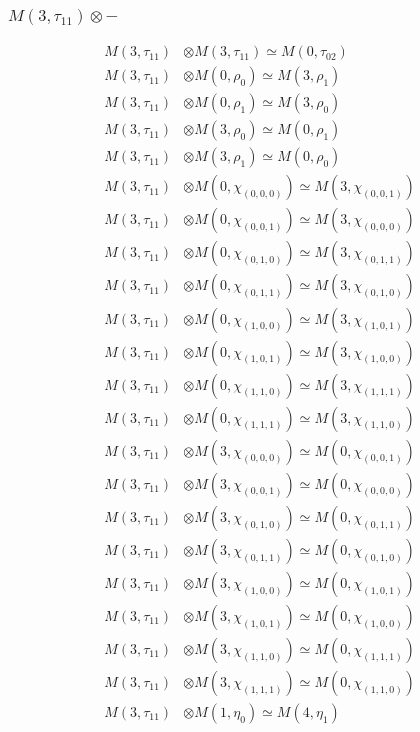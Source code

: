 \subsubsection{$ M(3,\tau_{11})\otimes -$}
\begin{align*}
M(3,\tau_{11}) &\otimes M(3,\tau_{11}) \simeq M(0,\tau_{02}) \\
M(3,\tau_{11}) &\otimes M(0,\rho_{0}) \simeq M(3,\rho_{1}) \\
M(3,\tau_{11}) &\otimes M(0,\rho_{1}) \simeq M(3,\rho_{0}) \\
M(3,\tau_{11}) &\otimes M(3,\rho_{0}) \simeq M(0,\rho_{1}) \\
M(3,\tau_{11}) &\otimes M(3,\rho_{1}) \simeq M(0,\rho_{0}) \\
M(3,\tau_{11}) &\otimes M(0,\chi_{(0,0,0)}) \simeq M(3,\chi_{(0,0,1)}) \\
M(3,\tau_{11}) &\otimes M(0,\chi_{(0,0,1)}) \simeq M(3,\chi_{(0,0,0)}) \\
M(3,\tau_{11}) &\otimes M(0,\chi_{(0,1,0)}) \simeq M(3,\chi_{(0,1,1)}) \\
M(3,\tau_{11}) &\otimes M(0,\chi_{(0,1,1)}) \simeq M(3,\chi_{(0,1,0)}) \\
M(3,\tau_{11}) &\otimes M(0,\chi_{(1,0,0)}) \simeq M(3,\chi_{(1,0,1)}) \\
M(3,\tau_{11}) &\otimes M(0,\chi_{(1,0,1)}) \simeq M(3,\chi_{(1,0,0)}) \\
M(3,\tau_{11}) &\otimes M(0,\chi_{(1,1,0)}) \simeq M(3,\chi_{(1,1,1)}) \\
M(3,\tau_{11}) &\otimes M(0,\chi_{(1,1,1)}) \simeq M(3,\chi_{(1,1,0)}) \\
M(3,\tau_{11}) &\otimes M(3,\chi_{(0,0,0)}) \simeq M(0,\chi_{(0,0,1)}) \\
M(3,\tau_{11}) &\otimes M(3,\chi_{(0,0,1)}) \simeq M(0,\chi_{(0,0,0)}) \\
M(3,\tau_{11}) &\otimes M(3,\chi_{(0,1,0)}) \simeq M(0,\chi_{(0,1,1)}) \\
M(3,\tau_{11}) &\otimes M(3,\chi_{(0,1,1)}) \simeq M(0,\chi_{(0,1,0)}) \\
M(3,\tau_{11}) &\otimes M(3,\chi_{(1,0,0)}) \simeq M(0,\chi_{(1,0,1)}) \\
M(3,\tau_{11}) &\otimes M(3,\chi_{(1,0,1)}) \simeq M(0,\chi_{(1,0,0)}) \\
M(3,\tau_{11}) &\otimes M(3,\chi_{(1,1,0)}) \simeq M(0,\chi_{(1,1,1)}) \\
M(3,\tau_{11}) &\otimes M(3,\chi_{(1,1,1)}) \simeq M(0,\chi_{(1,1,0)}) \\
M(3,\tau_{11}) &\otimes M(1,\eta_{0}) \simeq M(4,\eta_{1}) \\

\end{align*}
